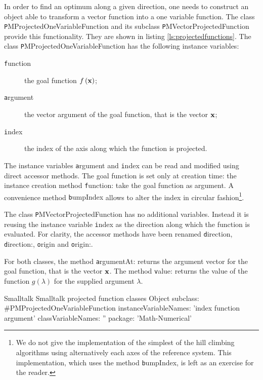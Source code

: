 In order to find an optimum along a given direction, one needs to
construct an object able to transform a vector function into a one
variable function.
The class {\texttt PMProjectedOneVariableFunction} and its subclass {\texttt
  PMVectorProjectedFunction} provide this functionality.
They are shown in listing \ref{ls:projectedfunctions}.
The class {\texttt PMProjectedOneVariableFunction} has the following instance
variables:
\begin{description}
  \item[\texttt function] the goal function $f\left({\textbf x}\right)$;
  \item[\texttt argument] the vector argument of the goal function,
  that is the vector ${\textbf x}$;
  \item[\texttt index] the index of the axis along which the function
  is projected.
\end{description}
The instance variables {\texttt argument} and {\texttt index} can be read
and modified using direct accessor methods.
The goal function is set only at creation time: the instance creation method {\texttt
function:} take the goal function as argument.
A convenience method {\texttt bumpIndex} allows to alter the index in circular
fashion\footnote{We do not give the implementation of the simplest
of the hill climbing algorithms using alternatively each axes of
the reference system. This implementation, which uses the method
{\texttt bumpIndex}, is left as an exercise for the reader.}.

The class {\texttt PMVectorProjectedFunction} has no additional
variables. Instead it is reusing the instance variable {\texttt index}
as the direction along which the function is evaluated. For
clarity, the accessor methods have been renamed {\texttt direction},
{\texttt direction:}, {\texttt origin} and {\texttt origin:}.

For both classes, the method {\texttt argumentAt:} returns the
argument vector for the goal function, that is the vector ${\textbf
x}$. The method {\texttt value:} returns the value of the function
$g\left(\lambda\right)$ for the supplied argument $\lambda$.

\begin{listing}[label=ls:projectedfunctions]{Smalltalk}
{Smalltalk projected function classes}
Object subclass: #PMProjectedOneVariableFunction
   instanceVariableNames: 'index function argument'
   classVariableNames: ''
   package: 'Math-Numerical'
\end{listing}

